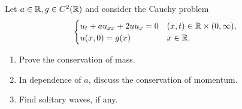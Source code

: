 \newpage
\begin{exercise}
    Let \(a \in \mathbb{R}, g \in C^2(\mathbb{R})\) and consider the Cauchy problem
    \[
        \begin{cases}
            u_{t} + a u_{xx} + 2 u u_{x} = 0 & (x, t) \in \mathbb{R} \times (0, \infty), \\
            u(x, 0) = g(x) & x \in \mathbb{R}.
        \end{cases}
    \]
    \begin{enumerate}
        \item Prove the conservation of mass.
        \item In dependence of \(a\), discuss the conservation of momentum.
        \item Find solitary waves, if any.
    \end{enumerate}
\end{exercise}
